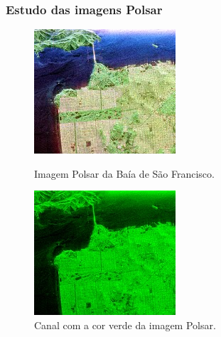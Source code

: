 \documentclass[12pt,a4paper]{article}
\begin{document}
\subsubsection{Estudo das imagens Polsar }

\begin{figure}[!h]
\begin{minipage}[b]{0.450\linewidth}
\includegraphics[width=\linewidth]{polsar_teste.jpeg}
\caption{Imagem Polsar da Baía de São Francisco.}
\label{fig5:sobel}
\end{minipage}\hfill
\begin{minipage}[b]{0.450\linewidth}
\includegraphics[width=\linewidth]{polsar_green.jpeg}
\caption{Canal com a cor verde da imagem Polsar.}
\label{fig5:Log}
\end{minipage}
\end{figure}
\end{document}

